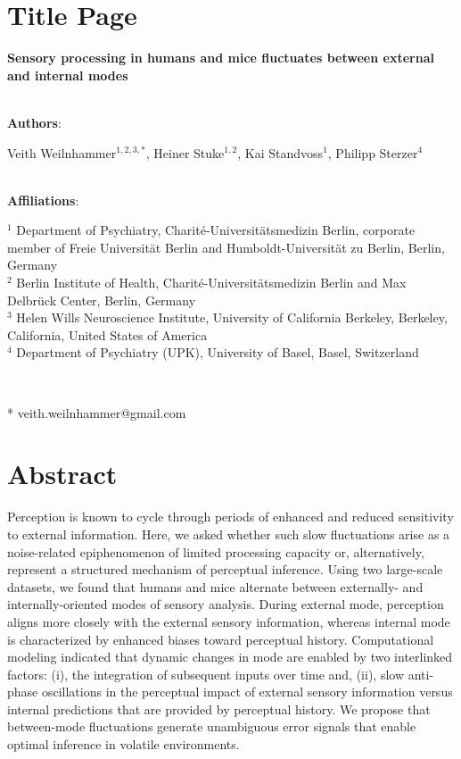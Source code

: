 \documentclass[
]{article}
\author{}
\date{\vspace{-2.5em}}
\begin{document}
\hypertarget{title-page}{%
\section{Title Page}\label{title-page}}

\textbf{Sensory processing in humans and mice fluctuates between
external and internal modes}\\
\strut \\

\textbf{Authors}:

Veith Weilnhammer\(^{1,2, 3, *}\), Heiner Stuke\(^{1,2}\), Kai
Standvoss\(^{1}\), Philipp Sterzer\(^{4}\)\\
\strut \\
\textbf{Affiliations}:

\(^{1}\) Department of Psychiatry, Charité-Universitätsmedizin Berlin,
corporate member of Freie Universität Berlin and Humboldt-Universität zu
Berlin, Berlin, Germany\\
\(^{2}\) Berlin Institute of Health, Charité-Universitätsmedizin Berlin
and Max Delbrück Center, Berlin, Germany\\
\(^{3}\) Helen Wills Neuroscience Institute, University of California
Berkeley, Berkeley, California, United States of America\\
\(^{4}\) Department of Psychiatry (UPK), University of Basel, Basel, 
Switzerland\\
\strut \

* veith.weilnhammer@gmail.com

\newpage

\hypertarget{abstract}{%
\section{Abstract}\label{abstract}}

Perception is known to cycle through periods of enhanced and reduced
sensitivity to external information. Here, we asked whether such slow
fluctuations arise as a noise-related epiphenomenon of limited
processing capacity or, alternatively, represent a structured mechanism
of perceptual inference. Using two large-scale datasets, we found that
humans and mice alternate between externally- and internally-oriented
modes of sensory analysis. During external mode, perception aligns more
closely with the external sensory information, whereas internal mode is
characterized by enhanced biases toward perceptual history.
Computational modeling indicated that dynamic changes in mode are
enabled by two interlinked factors: (i), the integration of subsequent
inputs over time and, (ii), slow anti-phase oscillations in the
perceptual impact of external sensory information versus internal
predictions that are provided by perceptual history. We propose that
between-mode fluctuations generate unambiguous error signals that enable
optimal inference in volatile environments.
\end{document}
